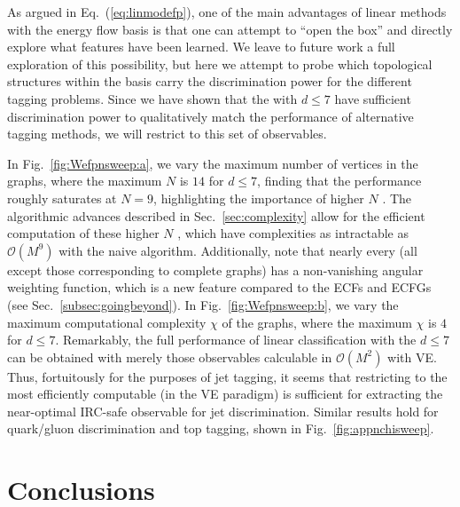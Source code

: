 \documentclass[letterpaper,11pt]{article}
\DeclareRobustCommand{\Sec}[1]{Sec.~\ref{#1}}
\DeclareRobustCommand{\Fig}[1]{Fig.~\ref{#1}}
\DeclareRobustCommand{\Eq}[1]{Eq.~(\ref{#1})}
\newcommand{\B}{\text{EFP}\xspace}
\newcommand{\Bs}{\text{EFPs}\xspace}
\begin{document}
As argued in \Eq{eq:linmodefp}, one of the main advantages of linear methods with the energy flow basis is that one can attempt to ``open the box'' and directly explore what features have been learned.
%
We leave to future work a full exploration of this possibility, but here we attempt to probe which topological structures within the \B basis carry the discrimination power for the different tagging problems.
%
Since we have shown that the \Bs with $d\le 7$ have sufficient discrimination power to qualitatively match the performance of alternative tagging methods, we will restrict to this set of observables.

In \Fig{fig:Wefpnsweep:a}, we vary the maximum number of vertices in the \B graphs, where the maximum $N$ is $14$ for $d \le 7$, finding that the performance roughly saturates at $N=9$, highlighting the importance of higher $N$ \Bs.
%
The algorithmic advances described in \Sec{sec:complexity} allow for the efficient computation of these higher $N$ \Bs, which have complexities as intractable as $\mathcal O(M^9)$ with the naive algorithm.
%
Additionally, note that nearly every \B (all except those corresponding to complete graphs) has a non-vanishing angular weighting function, which is a new feature compared to the ECFs and ECFGs (see \Sec{subsec:goingbeyond}).
%
In \Fig{fig:Wefpnsweep:b}, we vary the maximum computational complexity $\chi$ of the \B graphs, where the maximum $\chi$ is $4$ for $d \le 7$.
%
Remarkably, the full performance of linear classification with the $d\le7$ \Bs can be obtained with merely those observables calculable in $\mathcal O(M^2)$ with VE.
%
Thus, fortuitously for the purposes of jet tagging, it seems that restricting to the most efficiently computable \Bs (in the VE paradigm) is sufficient for extracting the near-optimal IRC-safe observable for jet discrimination.
%
Similar results hold for quark/gluon discrimination and top tagging, shown in \Fig{fig:appnchisweep}.


\section{Conclusions}
\label{sec:conclusion}
\end{document}

